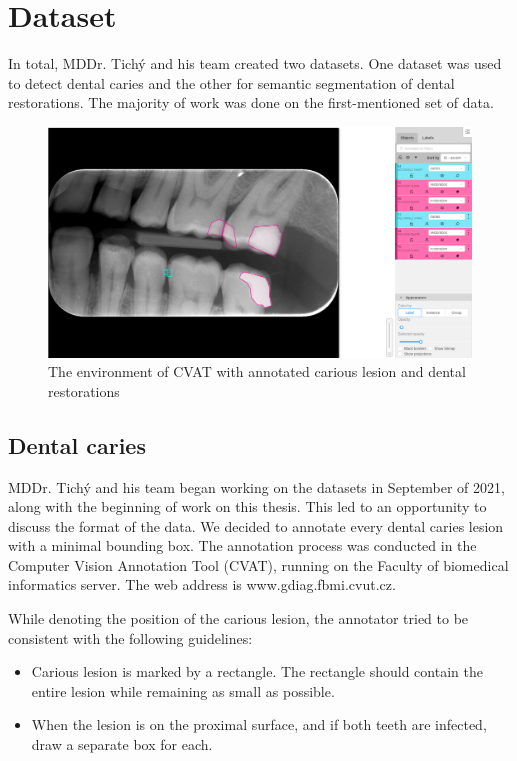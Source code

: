 \chapter{Dataset}
\label{chapter:dataset}
In total,  MDDr. Tichý and his team created two datasets. One dataset was used to detect dental caries and the other for semantic segmentation of dental restorations. The majority of work was done on the first-mentioned set of data.

\begin{figure}
    \centering
    \includegraphics[width=\linewidth]{images/cvat.png}
    \caption{The environment of CVAT with annotated carious lesion and dental restorations}
    \label{fig:cvat}
\end{figure}

\section{Dental caries}
\label{sec:dataset:dental_caries}
MDDr. Tichý and his team began working on the datasets in September of 2021, along with the beginning of work on this thesis. This led to an opportunity to discuss the format of the data. We decided to annotate every dental caries lesion with a minimal bounding box. The annotation process was conducted in the Computer Vision Annotation Tool (CVAT), running on the Faculty of biomedical informatics server. The web address is www.gdiag.fbmi.cvut.cz.

While denoting the position of the carious lesion, the annotator tried to be consistent with the following guidelines:

\begin{itemize}
    \item Carious lesion is marked by a rectangle. The rectangle should contain the entire lesion while remaining as small as possible.
    \item When the lesion is on the proximal surface, and if both teeth are infected, draw a separate box for each.
\end{itemize}

